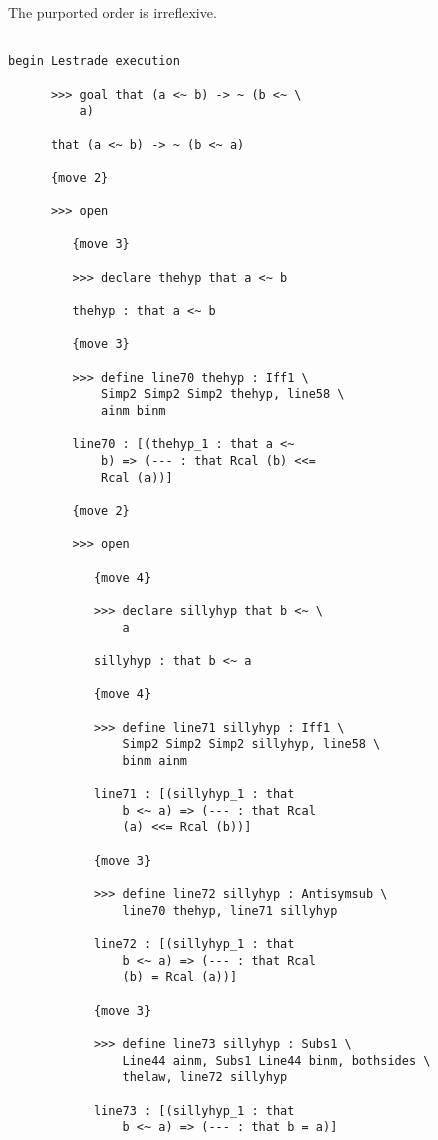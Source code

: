 \documentclass[12pt]{article}
\begin{document}
The purported order is irreflexive.

\begin{verbatim}

begin Lestrade execution

      >>> goal that (a <~ b) -> ~ (b <~ \
          a)

      that (a <~ b) -> ~ (b <~ a)

      {move 2}

      >>> open

         {move 3}

         >>> declare thehyp that a <~ b

         thehyp : that a <~ b

         {move 3}

         >>> define line70 thehyp : Iff1 \
             Simp2 Simp2 Simp2 thehyp, line58 \
             ainm binm

         line70 : [(thehyp_1 : that a <~ 
             b) => (--- : that Rcal (b) <<= 
             Rcal (a))]

         {move 2}

         >>> open

            {move 4}

            >>> declare sillyhyp that b <~ \
                a

            sillyhyp : that b <~ a

            {move 4}

            >>> define line71 sillyhyp : Iff1 \
                Simp2 Simp2 Simp2 sillyhyp, line58 \
                binm ainm

            line71 : [(sillyhyp_1 : that 
                b <~ a) => (--- : that Rcal 
                (a) <<= Rcal (b))]

            {move 3}

            >>> define line72 sillyhyp : Antisymsub \
                line70 thehyp, line71 sillyhyp

            line72 : [(sillyhyp_1 : that 
                b <~ a) => (--- : that Rcal 
                (b) = Rcal (a))]

            {move 3}

            >>> define line73 sillyhyp : Subs1 \
                Line44 ainm, Subs1 Line44 binm, bothsides \
                thelaw, line72 sillyhyp

            line73 : [(sillyhyp_1 : that 
                b <~ a) => (--- : that b = a)]


\end{verbatim}
\end{document}

